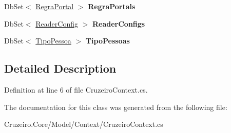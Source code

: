 \begin{DoxyCompactItemize}
\item 
Db\+Set$<$ \hyperlink{class_cruzeiro_1_1_core_1_1_model_1_1_regra_portal}{Regra\+Portal} $>$ {\bfseries Regra\+Portals}\hypertarget{class_cruzeiro_1_1_core_1_1_model_1_1_context_1_1_cruzeiro_context_a81112c9e2a527e207d798c170202c1ba}{}\label{class_cruzeiro_1_1_core_1_1_model_1_1_context_1_1_cruzeiro_context_a81112c9e2a527e207d798c170202c1ba}

\item 
Db\+Set$<$ \hyperlink{class_cruzeiro_1_1_core_1_1_model_1_1_reader_config}{Reader\+Config} $>$ {\bfseries Reader\+Configs}\hypertarget{class_cruzeiro_1_1_core_1_1_model_1_1_context_1_1_cruzeiro_context_afa0d3bd8567ac8a0f4b91920649aae58}{}\label{class_cruzeiro_1_1_core_1_1_model_1_1_context_1_1_cruzeiro_context_afa0d3bd8567ac8a0f4b91920649aae58}

\item 
Db\+Set$<$ \hyperlink{class_cruzeiro_1_1_core_1_1_model_1_1_tipo_pessoa}{Tipo\+Pessoa} $>$ {\bfseries Tipo\+Pessoas}\hypertarget{class_cruzeiro_1_1_core_1_1_model_1_1_context_1_1_cruzeiro_context_a8263221ee102ae2b6c8330be2078d7dc}{}\label{class_cruzeiro_1_1_core_1_1_model_1_1_context_1_1_cruzeiro_context_a8263221ee102ae2b6c8330be2078d7dc}

\end{DoxyCompactItemize}


\subsection{Detailed Description}


Definition at line 6 of file Cruzeiro\+Context.\+cs.



The documentation for this class was generated from the following file\+:\begin{DoxyCompactItemize}
\item 
Cruzeiro.\+Core/\+Model/\+Context/Cruzeiro\+Context.\+cs\end{DoxyCompactItemize}
